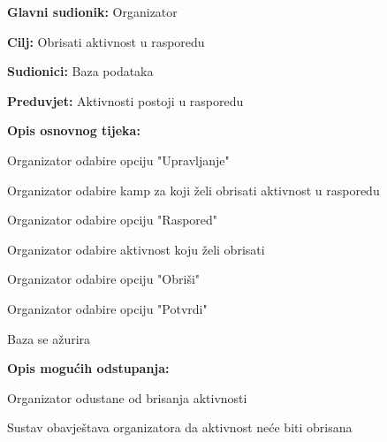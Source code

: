 					\noindent {}
					\begin{packed_item}

						\item \textbf{Glavni sudionik: } Organizator
						\item  \textbf{Cilj:} Obrisati aktivnost u rasporedu
						\item  \textbf{Sudionici:} Baza podataka
						\item  \textbf{Preduvjet:} Aktivnosti postoji u rasporedu	
						\item  \textbf{Opis osnovnog tijeka:}
						
						\item[] \begin{packed_enum}
							
							\item Organizator odabire opciju "Upravljanje"
							\item Organizator odabire kamp za koji želi obrisati aktivnost u rasporedu
							\item Organizator odabire opciju "Raspored"
							\item Organizator odabire aktivnost koju želi obrisati
							\item Organizator odabire opciju "Obriši"
							\item Organizator odabire opciju "Potvrdi"
							\item Baza se ažurira
		
						\end{packed_enum}
						
						\item  \textbf{Opis mogućih odstupanja:}
						
						\item[] \begin{packed_item}
							
							\item[2.a] Organizator odustane od brisanja aktivnosti
							\item[] \begin{packed_enum}
								
								\item Sustav obavještava organizatora da aktivnost neće biti obrisana

							\end{packed_enum}			
						\end{packed_item}
					\end{packed_item}
				
